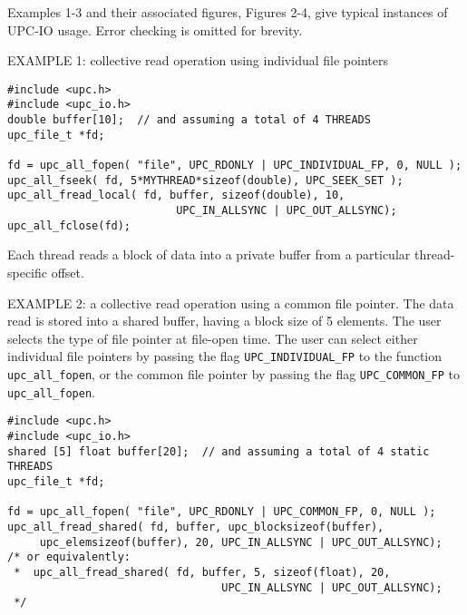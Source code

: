 \np Examples 1-3 and their associated figures, Figures 2-4, give typical
instances of UPC-IO usage. Error checking is omitted for brevity.

\np EXAMPLE 1: collective read operation using individual file pointers
\begin{verbatim}
#include <upc.h>
#include <upc_io.h>
double buffer[10];  // and assuming a total of 4 THREADS
upc_file_t *fd; 

fd = upc_all_fopen( "file", UPC_RDONLY | UPC_INDIVIDUAL_FP, 0, NULL );
upc_all_fseek( fd, 5*MYTHREAD*sizeof(double), UPC_SEEK_SET );
upc_all_fread_local( fd, buffer, sizeof(double), 10, 
                          UPC_IN_ALLSYNC | UPC_OUT_ALLSYNC);
upc_all_fclose(fd);
\end{verbatim}


 Each thread reads a block of data into a private buffer from a particular thread-specific offset.

\np EXAMPLE 2: a collective read operation using a common file pointer. 
The data read is stored into a shared buffer,
having a block size of 5 elements. The user selects the type of file pointer
at file-open time. The user can select either individual file pointers by
passing the flag {\tt UPC\_INDIVIDUAL\_FP} to the function {\tt upc\_all\_fopen}, or the
common file pointer by passing the flag {\tt UPC\_COMMON\_FP} to {\tt upc\_all\_fopen}.

\begin{verbatim}
#include <upc.h>
#include <upc_io.h>
shared [5] float buffer[20];  // and assuming a total of 4 static THREADS
upc_file_t *fd; 

fd = upc_all_fopen( "file", UPC_RDONLY | UPC_COMMON_FP, 0, NULL );
upc_all_fread_shared( fd, buffer, upc_blocksizeof(buffer), 
     upc_elemsizeof(buffer), 20, UPC_IN_ALLSYNC | UPC_OUT_ALLSYNC);
/* or equivalently: 
 *  upc_all_fread_shared( fd, buffer, 5, sizeof(float), 20, 
                                 UPC_IN_ALLSYNC | UPC_OUT_ALLSYNC); 
 */
\end{verbatim}

